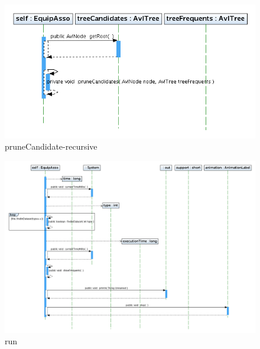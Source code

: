 \newpage
\begin{figure}
\includegraphics[width=1.2\textwidth]{EquipAsso/pruneCandidates.png}
\caption{pruneCandidate-recursive}
\end{figure}
\newpage
\begin{figure}
\includegraphics[width=1.2\textwidth]{EquipAsso/run.png}
\caption{run}
\end{figure}
\newpage

